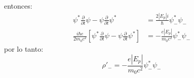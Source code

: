 entonces:
\begin{align*}
   \psi^* \frac{\partial }{\partial t} \psi -\psi \frac{\partial }{\partial t} \psi^*&=\frac{2|E_p|i}{\hbar} \psi_-^*\psi_-\\
   \frac{i\hbar e}{2m_0 c^2} \left[\psi^* \frac{\partial }{\partial t} \psi -\psi \frac{\partial }{\partial t} \psi^*\right]&=-\frac{e|E_p|}{m_0c^2} \psi_-^* \psi_-
\end{align*}
por lo tanto:
\begin{equation*}
   {\rho}'_-=-\frac{e|E_p|}{m_0c^2} \psi_-^* \psi_-
\end{equation*}
